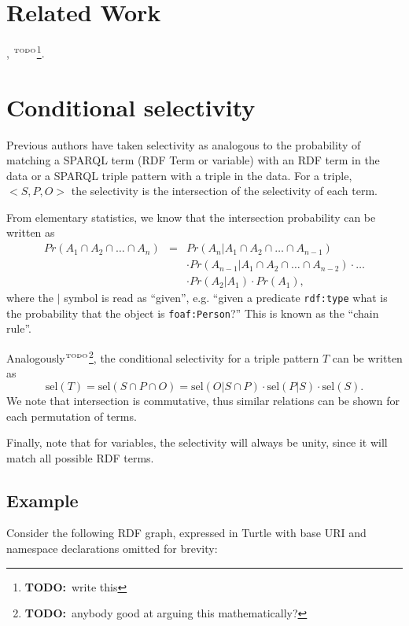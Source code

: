 \documentclass[12pt, draft]{article}
\newcommand{\rdfterm}[1]{\texttt{#1}}
\newcommand{\todo}[1]{\ensuremath{^{\textrm{\tiny{TODO}\normalsize}}}\footnote{\textbf{TODO:}~#1}}
\newcommand{\sel}[1]{\ensuremath{\mathrm{sel}\left(#1\right)}}
\begin{document}
\section{Related Work}

\cite{splendid}, \cite{wodqa} \todo{write this}.

\section{Conditional selectivity}\label{sec:cond}

Previous authors have taken selectivity as analogous to the
probability of matching a SPARQL term (RDF Term or variable) with an
RDF term in the data or a SPARQL triple pattern with a triple in the
data.  For a triple, $<S, P, O>$ the selectivity is the intersection
of the selectivity of each term.

From elementary statistics, we know that the intersection probability
can be written as
\begin{eqnarray}
Pr(A_1 \cap A_2  \cap \ldots \cap A_n) &=& 
  Pr(A_n | A_1 \cap A_2  \cap \ldots \cap A_{n-1}) \nonumber\\
  &&\cdot Pr(A_{n-1} | A_1 \cap A_2  \cap \ldots \cap A_{n-2}) \cdot \ldots \nonumber\\
  && \cdot Pr(A_2 | A_1) \cdot Pr(A_1) ,
\end{eqnarray}
where the $|$ symbol is read as ``given'', e.g. ``given a predicate
\rdfterm{rdf:type} what is the probability that the object is
\rdfterm{foaf:Person}?'' This is known as the ``chain rule''.

Analogously\todo{anybody good at arguing this mathematically?}, the
conditional selectivity for a triple pattern $T$ can be written as 
\begin{equation}\label{eq:sel}
\sel{T} = \sel{S \cap P \cap O} = \sel{O | S \cap P} \cdot \sel{P | S}
\cdot \sel{S} . 
\end{equation}
We note that intersection is commutative, thus similar
relations can be shown for each permutation of terms.

Finally, note that for variables, the selectivity will always be
unity, since it will match all possible RDF terms.

\subsection{Example}\label{sec:example}

Consider the following RDF graph, expressed in Turtle with base URI
and namespace declarations omitted for brevity:
\end{document}
